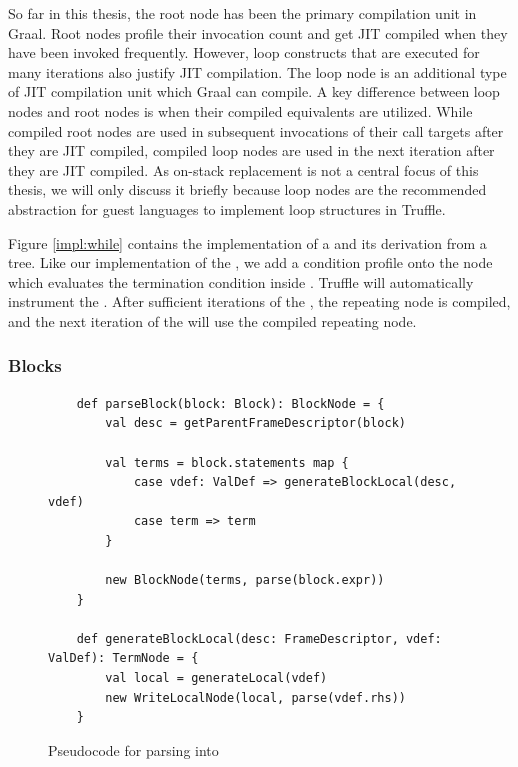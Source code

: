 So far in this thesis, the root node has been the primary compilation unit in Graal.
Root nodes profile their invocation count and get JIT compiled when they have been invoked frequently.
However, loop constructs that are executed for many iterations also justify JIT compilation.
The loop node is an additional type of JIT compilation unit which Graal can compile.
A key difference between loop nodes and root nodes is when their compiled equivalents are utilized.
While compiled root nodes are used in subsequent invocations of their call targets after they are JIT compiled, compiled loop nodes are used in the next iteration after they are JIT compiled.
As on-stack replacement is not a central focus of this thesis, we will only discuss it briefly because loop nodes are the recommended abstraction for guest languages to implement loop structures in Truffle.

Figure \ref{impl:while} contains the implementation of a  and its derivation from a  tree.
Like our implementation of the , we add a condition profile onto the node which evaluates the termination condition inside .
Truffle will automatically instrument the .
After sufficient iterations of the , the repeating node is compiled, and the next iteration of the  will use the compiled repeating node.

\subsubsection*{Blocks}

\begin{figure}[!htb]
	\begin{verbatim}
	def parseBlock(block: Block): BlockNode = {
		val desc = getParentFrameDescriptor(block)
			
		val terms = block.statements map {
			case vdef: ValDef => generateBlockLocal(desc, vdef)
			case term => term 
		}
			
		new BlockNode(terms, parse(block.expr))
	}
		
	def generateBlockLocal(desc: FrameDescriptor, vdef: ValDef): TermNode = {
		val local = generateLocal(vdef)
		new WriteLocalNode(local, parse(vdef.rhs))
	}	
	\end{verbatim}
	\caption{Pseudocode for parsing  into }
	\label{impl:parse-block}
\end{figure}

